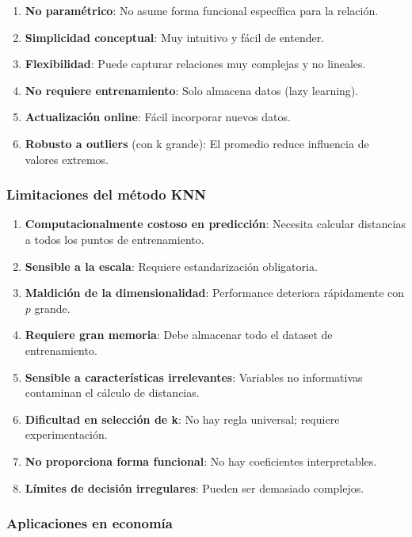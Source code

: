 \documentclass[
  doc,
  floatsintext,
  longtable,
  a4paper,
  nolmodern,
  notxfonts,
  notimes,
  12pt,
  colorlinks=true,linkcolor=blue,citecolor=blue,urlcolor=blue]{apa7}
\begin{document}
\begin{enumerate}
\def\labelenumi{\arabic{enumi}.}
\item
  \textbf{No paramétrico}: No asume forma funcional específica para la
  relación.
\item
  \textbf{Simplicidad conceptual}: Muy intuitivo y fácil de entender.
\item
  \textbf{Flexibilidad}: Puede capturar relaciones muy complejas y no
  lineales.
\item
  \textbf{No requiere entrenamiento}: Solo almacena datos (lazy
  learning).
\item
  \textbf{Actualización online}: Fácil incorporar nuevos datos.
\item
  \textbf{Robusto a outliers} (con k grande): El promedio reduce
  influencia de valores extremos.
\end{enumerate}

\subsubsection{Limitaciones del método
KNN}\label{limitaciones-del-muxe9todo-knn}

\begin{enumerate}
\def\labelenumi{\arabic{enumi}.}
\item
  \textbf{Computacionalmente costoso en predicción}: Necesita calcular
  distancias a todos los puntos de entrenamiento.
\item
  \textbf{Sensible a la escala}: Requiere estandarización obligatoria.
\item
  \textbf{Maldición de la dimensionalidad}: Performance deteriora
  rápidamente con \(p\) grande.
\item
  \textbf{Requiere gran memoria}: Debe almacenar todo el dataset de
  entrenamiento.
\item
  \textbf{Sensible a características irrelevantes}: Variables no
  informativas contaminan el cálculo de distancias.
\item
  \textbf{Dificultad en selección de k}: No hay regla universal;
  requiere experimentación.
\item
  \textbf{No proporciona forma funcional}: No hay coeficientes
  interpretables.
\item
  \textbf{Límites de decisión irregulares}: Pueden ser demasiado
  complejos.
\end{enumerate}

\subsubsection{Aplicaciones en
economía}\label{aplicaciones-en-economuxeda-5}
\end{document}
